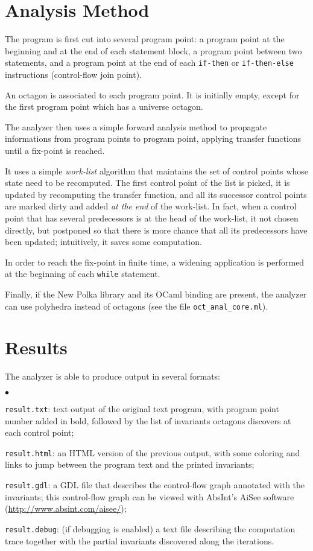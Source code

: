 \documentclass[twosides]{report}
\newenvironment{mylist}
        {\vskip-3mm\begin{list}{$\bullet$}{\setlength{\leftmargin}{.5cm}}}
        {\end{list}}
\begin{document}
\section{Analysis Method}

The program is first cut into several program point: a program point
at the beginning and at the end of each statement block, a program point
between two statements, and a program point at the end of each {\tt if-then}
or {\tt if-then-else} instructions (control-flow join point).

\bigskip

An octagon is associated to each program point.
It is initially empty, except for the first program point which has a
universe octagon.

The analyzer then uses a simple forward analysis method to propagate 
informations from program points to program point, applying transfer functions
until a fix-point is reached.

It uses a simple {\em work-list\/} algorithm that maintains the set of 
control points whose state need to be recomputed.
The first control point of the list is picked, it is updated by recomputing
the transfer function, and all its successor control points are marked
dirty and added {\em at the end\/} of the work-list.
In fact, when a control point that has several predecessors is at the
head of the work-list, it not chosen directly, but postponed so that there
is more chance that all its predecessors have been updated;
intuitively, it saves some computation.

\bigskip

In order to reach the fix-point in finite time, a widening application is
performed at the beginning of each {\tt while} statement.

\bigskip

Finally, if the New Polka library and its OCaml binding are present,
the analyzer can use polyhedra instead of octagons
(see the file {\tt oct\_anal\_core.ml}).

\section{Results}

The analyzer is able to produce output in several formats:
\begin{mylist}
\item {\tt result.txt}: 
text output of the original text program, with program point number
added in bold, followed by the list of invariants octagons discovers
at each control point;
\item {\tt result.html}: 
an HTML version of the previous output, with some coloring and
links to jump between the program text and the printed invariants;
\item {\tt result.gdl}: 
a GDL file that describes the control-flow graph annotated with
the invariants; this control-flow graph can be viewed with 
AbsInt's AiSee software (\url{http://www.absint.com/aisee/});
\item {\tt result.debug}: 
(if debugging is enabled) a text file describing
the computation trace together with the
partial invariants discovered along the iterations.
\end{mylist}
\end{document}
